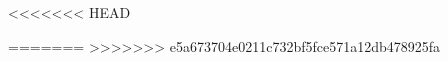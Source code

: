 \documentclass[12pt]{report}
\begin{document}
\setcounter{page}{0}



\tableofcontents
\setcounter{page}{0}




%

<<<<<<< HEAD

=======
>>>>>>> e5a673704e0211c732bf5fce571a12db478925fa


\end{document}
